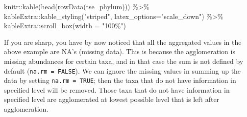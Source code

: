 \documentclass[
  oneside]{book}
\newenvironment{Shaded}{\begin{snugshade}}{\end{snugshade}}
\newcommand{\AttributeTok}[1]{\textcolor[rgb]{0.77,0.63,0.00}{#1}}
\newcommand{\FunctionTok}[1]{\textcolor[rgb]{0.00,0.00,0.00}{#1}}
\newcommand{\NormalTok}[1]{#1}
\newcommand{\SpecialCharTok}[1]{\textcolor[rgb]{0.00,0.00,0.00}{#1}}
\newcommand{\StringTok}[1]{\textcolor[rgb]{0.31,0.60,0.02}{#1}}
\begin{document}
\begin{Shaded}
\begin{Highlighting}[]
\NormalTok{knitr}\SpecialCharTok{::}\FunctionTok{kable}\NormalTok{(}\FunctionTok{head}\NormalTok{(}\FunctionTok{rowData}\NormalTok{(tse\_phylum))) }\SpecialCharTok{\%\textgreater{}\%} 
\NormalTok{  kableExtra}\SpecialCharTok{::}\FunctionTok{kable\_styling}\NormalTok{(}\StringTok{"striped"}\NormalTok{, }
                            \AttributeTok{latex\_options=}\StringTok{"scale\_down"}\NormalTok{) }\SpecialCharTok{\%\textgreater{}\%} 
\NormalTok{  kableExtra}\SpecialCharTok{::}\FunctionTok{scroll\_box}\NormalTok{(}\AttributeTok{width =} \StringTok{"100\%"}\NormalTok{)}
\end{Highlighting}
\end{Shaded}

\begin{table}
\centering
{}
\end{table}

If you are sharp, you have by now noticed that all the aggregated
values in the above example are NA's (missing data). This is because
the agglomeration is missing abundances for certain taxa, and in that
case the sum is not defined by default (\texttt{na.rm\ =\ FALSE}). We can
ignore the missing values in summing up the data by setting \texttt{na.rm\ =\ TRUE}; then the taxa that do not have information in specified level
will be removed. Those taxa that do not have information in specified
level are agglomerated at lowest possible level that is left after
agglomeration.
\end{document}
